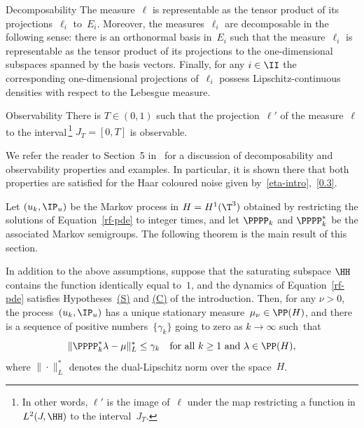\begin{enonce*}{Decomposability}
The measure~$\ell$ is representable as the tensor product of its projections~$\ell_i$ to~$E_i$. Moreover, the measures~$\ell_i$ are decomposable in the following sense: there is an orthonormal basis in~$E_i$ such that the measure~$\ell_i$ is representable as the tensor product of its projections to the one-dimensional subspaces spanned by the basis vectors. Finally, for any $i\in\II$ the corresponding one-dimensional projections of~$\ell_i$ possess Lipschitz-continuous densities with respect to the Lebesgue measure.
\end{enonce*}
\begin{enonce*}{Observability}
There is $T\in(0,1)$ such that the projection~$\ell'$ of the measure~$\ell$ to the interval\,\footnote{In other words, $\ell'$ is the image of~$\ell$ under the map restricting a function in $L^2(J,\HH)$ to the interval~$J_T$.} $J_T=[0,T]$ is observable.
\end{enonce*}

We refer the reader to Section~5 in~\cite{KNS-2020} for a discussion of decomposability and observability properties and examples. In particular, it is shown there that both properties are satisfied for the Haar coloured noise given by~\eqref{eta-intro},~\eqref{0.3}.

Let $(u_k, \IP_u)$ be the Markov process in $H=H^1(\T^3)$ obtained by restricting the solutions of Equation~\eqref{rf-pde} to integer times, and let $\PPPP_k$ and $\PPPP_k^*$ be the associated Markov semigroups. The following theorem is the main result of this section.

\begin{theorem} \label{T:4.3}
In addition to the above assumptions, suppose that the saturating subspace $\HH$ contains the function identically equal to~$1$, and the dynamics of Equation~\eqref{rf-pde} satisfies Hypotheses~\hyperlink{S}{\rm(S)} and \hyperlink{C}{\rm(C)} of the introduction. Then, for any $\nu>0$, the process~$(u_k,\IP_u)$ has a unique stationary measure~$\mu_\nu\in\PP(H)$,
and there is a sequence of positive numbers~$\{\gamma_k\}$ going to zero as $k\to\infty$ such~that
\begin{equation} \label{uniform-convergence}
\|\PPPP_k^*\lambda-\mu\|_L^*\le \gamma_k\quad\text{for all $k\ge1$ and $\lambda\in\PP(H)$},
\end{equation}
where $\|\cdot\|_L^*$ denotes the dual-Lipschitz norm over the space~$H$.
\end{theorem}

